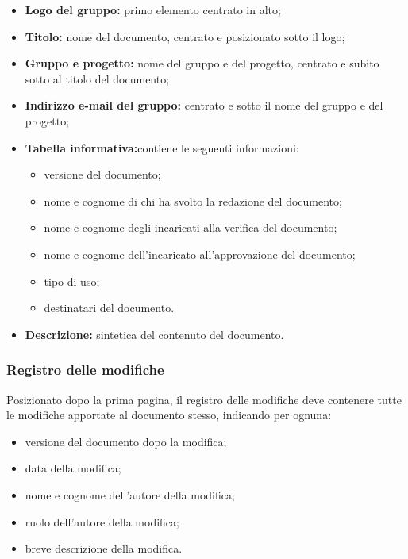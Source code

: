 \documentclass[./../NormediProgetto.tex]{subfiles}
\begin{document}
\begin{itemize}
    \item{\textbf{Logo del gruppo:}} primo elemento centrato in alto; 
    \item{\textbf{Titolo:}} nome del documento, centrato e posizionato sotto il logo; 
    \item{\textbf{Gruppo e progetto:}} nome del gruppo e del progetto, centrato e subito sotto al titolo del documento; 
    \item{\textbf{Indirizzo e-mail del gruppo:}} centrato e sotto il nome del gruppo e del progetto; 
    \item{\textbf{Tabella informativa:}}contiene le seguenti informazioni: 
    \begin{itemize} 
        \item versione del documento;
        \item nome e cognome di chi ha svolto la redazione del documento; 
        \item nome e cognome degli incaricati alla verifica del documento; 
        \item nome e cognome dell'incaricato all’approvazione del documento;
        \item tipo di uso; 
        \item  destinatari del documento.
        \end{itemize}
    \item {\textbf{Descrizione:}} sintetica del contenuto del documento.
\end{itemize}

\subsubsection{Registro delle modifiche}

Posizionato dopo la prima pagina, il registro delle modifiche deve contenere tutte le modifiche apportate al documento stesso, indicando per ognuna:

\begin{itemize}
\item versione del documento dopo la modifica;
\item data della modifica;
\item nome e cognome dell'autore della modifica;
\item ruolo dell'autore della modifica;
\item breve descrizione della modifica.
\end{itemize}
\end{document}
